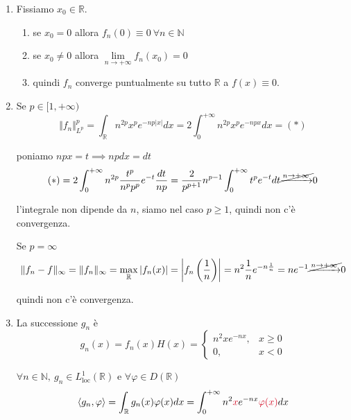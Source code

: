 \begin{enumerate}
\item Fissiamo $x_{0} \in \mathbb{R}$.
\begin{enumerate}
\item se $x_{0} =0$ allora $f_{n}( 0) \equiv 0\ \forall n\in \mathbb{N}$
\item se $x_{0} \neq 0$ allora $\lim\limits _{n\rightarrow +\infty } f_{n}( x_{0}) =0$
\item quindi $f_{n}$ converge puntualmente su tutto $\mathbb{R}$ a $f( x) \equiv 0$.
\end{enumerate}

\item Se $p\in [ 1,+\infty )$\begin{equation*}
\Vert f_{n}\Vert ^{p}_{L^{p}} =\int _{\mathbb{R}} n^{2p} x^{p} e^{-np| x| } dx=2\int ^{+\infty }_{0} n^{2p} x^{p} e^{-npx} dx=( *)
\end{equation*}

poniamo $npx=t\implies npdx=dt$\begin{equation*}
( *) =2\int ^{+\infty }_{0} n^{2p}\frac{t^{p}}{n^{p} p^{p}} e^{-t}\frac{dt}{np} =\frac{2}{p^{p+1}} n^{p-1}\int ^{+\infty }_{0} t^{p} e^{-t} dt\cancel{\xrightarrow{n\rightarrow +\infty }} 0
\end{equation*}

l'integrale non dipende da $n$, siamo nel caso $p\geqslant 1$, quindi non c'è convergenza.

Se $p=\infty $\begin{equation*}
\Vert f_{n} -f\Vert _{\infty } =\Vert f_{n}\Vert _{\infty } =\max_{\mathbb{R}}| f_{n}( x)| =\left| f_{n}\left(\frac{1}{n}\right)\right| =n^{2}\frac{1}{n} e^{-n\frac{1}{n}} =ne^{-1}\cancel{\xrightarrow{n\rightarrow +\infty }} 0
\end{equation*}

quindi non c'è convergenza.
\item La successione $g_{n}$ è\begin{equation*}
g_{n}( x) =f_{n}( x) H( x) =\begin{cases}
n^{2} xe^{-nx} , & x\geqslant 0\\
0, & x< 0
\end{cases}
\end{equation*}

$\forall n\in \mathbb{N} ,\ g_{n} \in L^{1}_{\mathrm{loc}}(\mathbb{R})$ e $\forall \varphi \in D(\mathbb{R})$\begin{equation*}
\langle g_{n} ,\varphi \rangle =\int _{\mathbb{R}} g_{n}( x) \varphi ( x) dx=\int ^{+\infty }_{0} n^{2}\textcolor[rgb]{0.82,0.01,0.11}{x} e^{-nx}\textcolor[rgb]{0.82,0.01,0.11}{\varphi }\textcolor[rgb]{0.82,0.01,0.11}{(}\textcolor[rgb]{0.82,0.01,0.11}{x}\textcolor[rgb]{0.82,0.01,0.11}{)} dx
\end{equation*}


\end{enumerate}
